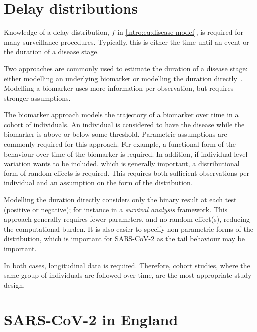 \documentclass[thesis.tex]{subfiles}
\begin{document}
\section{Delay distributions}

Knowledge of a delay distribution, $f$ in \cref{intro:eq:disease-model}, is required for many surveillance procedures.
Typically, this is either the time until an event or the duration of a disease stage.

Two approaches are commonly used to estimate the duration of a disease stage: either modelling an underlying biomarker or modelling the duration directly~\autocite[e.g.][]{sweetingEstimating}.
Modelling a biomarker uses more information per observation, but requires stronger assumptions.

The biomarker approach models the trajectory of a biomarker over time in a cohort of individuals.
An individual is considered to have the disease while the biomarker is above or below some threshold.
Parametric assumptions are commonly required for this approach.
For example, a functional form of the behaviour over time of the biomarker is required.
In addition, if individual-level variation wants to be included, which is generally important, a distributional form of random effects is required.
This requires both sufficient observations per individual and an assumption on the form of the distribution.

Modelling the duration directly considers only the binary result at each test (positive or negative); for instance in a \emph{survival analysis} framework.
This approach generally requires fewer parameters, and no random effect(s), reducing the computational burden.
It is also easier to specify non-parametric forms of the distribution, which is important for SARS-CoV-2 as the tail behaviour may be important.

In both cases, longitudinal data is required.
Therefore, cohort studies, where the same group of individuals are followed over time, are the most appropriate study design.

\section{SARS-CoV-2 in England}
\end{document}
